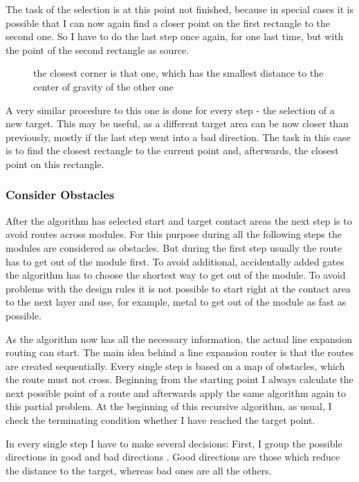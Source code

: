 The task of the selection is at this point not finished, because in special cases it is possible that I can now again find a closer point on the first rectangle to the second one. So I have to do the last step once again, for one last time, but with the point of the second rectangle as source.

\begin{figure}
	\centering
	
  	\caption{the closest corner is that one, which has the smallest distance to the center of gravity of the other one}
	\label{fig:rectangles_closest_corner}
\end{figure}

A very similar procedure to this one is done for every step - the selection of a new target. This may be useful, as a different target area can be now closer than previously, mostly if the last step went into a bad direction. The task in this case is to find the closest rectangle to the current point and, afterwards, the closest point on this rectangle.

\subsubsection{Consider Obstacles}
After the algorithm has selected start and target contact areas the next step is to avoid routes across modules. For this purpose during all the following steps the modules are considered as obstacles. But during the first step usually the route has to get out of the module first. To avoid additional, accidentally added gates the algorithm has to choose the shortest way to get out of the module. To avoid problems with the design rules it is not possible to start right at the contact area to the next layer and use, for example, metal to get out of the module as fast as possible.

As the algorithm now has all the necessary information, the actual line expansion routing can start. The main idea behind a line expansion router is that the routes are created sequentially. Every single step is based on a map of obstacles, which the route must not cross. Beginning from the starting point I always calculate the next possible point of a route and afterwards apply the same algorithm again to this partial problem. At the beginning of this recursive algorithm, as usual, I check the terminating condition whether I have reached the target point.

In every single step I have to make several decisions: First, I group the possible directions in good and bad directions . Good directions are those which reduce the distance to the target, whereas bad ones are all the others.

